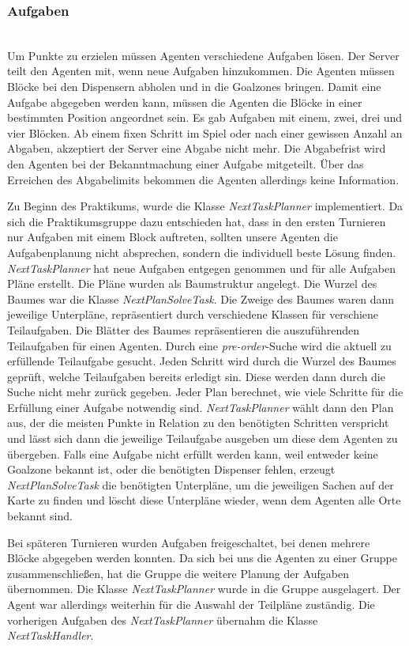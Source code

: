 \subsubsection{Aufgaben} ~\\
Um Punkte zu erzielen müssen Agenten verschiedene Aufgaben lösen. Der Server teilt den Agenten mit, wenn neue Aufgaben hinzukommen. Die Agenten müssen Blöcke bei den Dispensern abholen und in die Goalzones bringen. Damit eine Aufgabe abgegeben werden kann, müssen die Agenten die Blöcke in einer bestimmten Position angeordnet sein. Es gab Aufgaben mit einem, zwei, drei und vier Blöcken. Ab einem fixen Schritt im Spiel oder nach einer gewissen Anzahl an Abgaben, akzeptiert der Server eine Abgabe nicht mehr. Die Abgabefrist wird den Agenten bei der Bekanntmachung einer Aufgabe mitgeteilt. Über das Erreichen des Abgabelimits bekommen die Agenten allerdings keine Information.

Zu Beginn des Praktikums, wurde die Klasse \textit{NextTaskPlanner} implementiert. Da sich die Praktikumsgruppe dazu entschieden hat, dass in den ersten Turnieren nur Aufgaben mit einem Block auftreten, sollten unsere Agenten die Aufgabenplanung nicht absprechen, sondern die individuell beste Lösung finden. \textit{NextTaskPlanner} hat neue Aufgaben entgegen genommen und für alle Aufgaben Pläne erstellt.
Die Pläne wurden als Baumstruktur angelegt. Die Wurzel des Baumes war die Klasse \textit{NextPlanSolveTask}. Die Zweige des Baumes waren dann jeweilige Unterpläne, repräsentiert durch verschiedene Klassen für verschiene Teilaufgaben. Die Blätter des Baumes repräsentieren die auszuführenden Teilaufgaben für einen Agenten. Durch eine \textit{pre-order}-Suche wird die aktuell zu erfüllende Teilaufgabe gesucht. Jeden Schritt wird durch die Wurzel des Baumes geprüft, welche Teilaufgaben bereits erledigt sin. Diese werden dann durch die Suche nicht mehr zurück gegeben.
Jeder Plan berechnet, wie viele Schritte für die Erfüllung einer Aufgabe notwendig sind. \textit{NextTaskPlanner} wählt dann den Plan aus, der die meisten Punkte in Relation zu den benötigten Schritten verspricht und lässt sich dann die jeweilige Teilaufgabe ausgeben um diese dem Agenten zu übergeben.
Falls eine Aufgabe nicht erfüllt werden kann, weil entweder keine Goalzone bekannt ist, oder die benötigten Dispenser fehlen, erzeugt \textit{NextPlanSolveTask} die benötigten Unterpläne, um die jeweiligen Sachen auf der Karte zu finden und löscht diese Unterpläne wieder, wenn dem Agenten alle Orte bekannt sind.

Bei späteren Turnieren wurden Aufgaben freigeschaltet, bei denen mehrere Blöcke abgegeben werden konnten. Da sich bei uns die Agenten zu einer Gruppe zusammenschließen, hat die Gruppe die weitere Planung der Aufgaben übernommen. Die Klasse \textit{NextTaskPlanner} wurde in die Gruppe ausgelagert. Der Agent war allerdings weiterhin für die Auswahl der Teilpläne zuständig. Die vorherigen Aufgaben des \textit{NextTaskPlanner} übernahm die Klasse \textit{NextTaskHandler}. 

